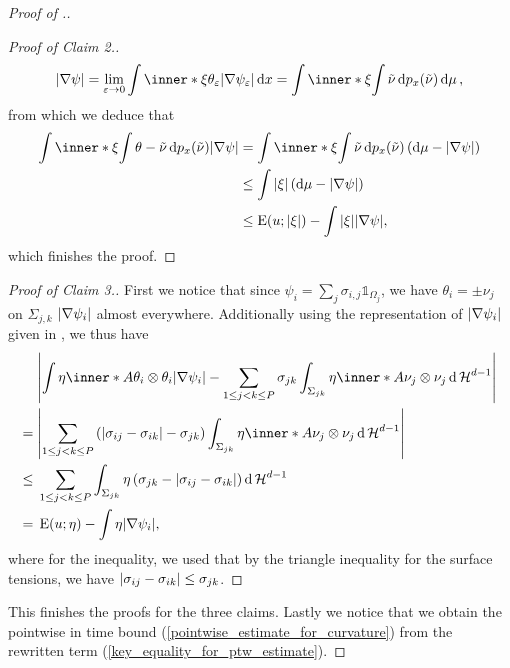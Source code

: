 \begin{proof}[Proof of .]
\begin{proof}[Proof of Claim 2.]
\begin{equation*}
			\abs{ \nabla \psi }
			=
			\lim_{ \varepsilon \to 0 }
			\int
			\inner*{ \xi }{ \theta_{ \varepsilon } }
			\abs{ \nabla \psi_{ \varepsilon } }
			\dd{ x }
			=
			\int
			\inner*{ \xi }{
				\int 
				\tilde{ \nu } 
				\dd{ p_{ x } ( \tilde{ \nu } ) } 
			}
			\dd{ \mu },
		\end{equation*}
		from which we deduce that
		\begin{align*}
			\int
			\inner*{ \xi }{
				\int
				\theta - \tilde{ \nu }
				\dd{ p_{ x } ( \tilde{ \nu } ) }
			}
			\abs{ \nabla \psi }
			& =
			\int
			\inner*{ \xi }{
				\int
				\tilde{ \nu }
				\dd{ p_{ x } ( \tilde{ \nu } ) }
			}
			\left(
			\dd{ \mu } - \abs{ \nabla \psi }
			\right)
			\\
			& \leq
			\int
			\abs{ \xi }
			\left(
			\dd{ \mu } - \abs{ \nabla \psi }
			\right)
			\\
			& \leq
			\energy ( u ; \abs{ \xi } )
			-
			\int
			\abs{ \xi }
			\abs{ \nabla \psi },
		\end{align*}
		which finishes the proof.
	\end{proof}
	
	\begin{proof}[Proof of Claim 3.]
		First we notice that since $ \psi_{ i } = \sum_{ j } \sigma_{ i , j } 
		\mathds{ 1 }_{ \Omega_{ j } } $, we have $ \theta_{ i } = \pm \nu_{ j } 
		$ on $ \Sigma_{ j , k } $ $ \abs{ \nabla \psi_{ i } }$ almost 
		everywhere.
		Additionally using the representation of $ \abs{ \nabla \psi_{ i } } $ 
		given in 
		, we thus have
		\begin{align*}
			&
			\abs{
				\int
				\eta 
				\inner*{ A }
				{ \theta_{ i } \otimes \theta_{ i } }
				\abs{ \nabla \psi_{ i } }
				-
				\sum_{ 1 \leq j < k \leq P }
				\sigma_{ j k }
				\int_{ \Sigma_{ j k } }
				\eta
				\inner*{ A }{ \nu_{ j } \otimes \nu_{ j } }
				\dd{ \hm^{ d - 1 } }
			}
			\\
			={} &
			\abs{ 
				\sum_{ 1 \leq j < k \leq P }
				\left( 
				\abs{ \sigma_{ i j } - \sigma_{ i k } }
				-
				\sigma_{ j k }
				\right)
				\int_{ \Sigma_{ j k  } }
				\eta
				\inner*{ A }{ \nu_{ j } \otimes \nu_{ j } }
				\dd{ \hm^{ d - 1 } }
			}
			\\
			\leq{} &
			\sum_{ 1 \leq j < k \leq P }
			\int_{ \Sigma_{ j k } }
			\eta
			\left(
			\sigma_{ j  k } - \abs{ \sigma_{ i j } - \sigma_{ i 
					k } }
			\right)
			\dd{ \hm^{ d - 1 } }
			\\
			={} &
			\energy ( u ; \eta )
			-
			\int
			\eta
			\abs{ \nabla \psi_{ i } },
		\end{align*}
		where for the inequality, we used that by the triangle inequality for 
		the surface tensions, we have
		$ \abs{ \sigma_{ i j } - \sigma_{ i k } } \leq \sigma_{ j k } $.
	\end{proof}
	This finishes the proofs for the three claims. Lastly we notice that we 
	obtain the pointwise in time bound (\ref{pointwise_estimate_for_curvature}) 
	from the rewritten term (\ref{key_equality_for_ptw_estimate}).
\end{proof}

